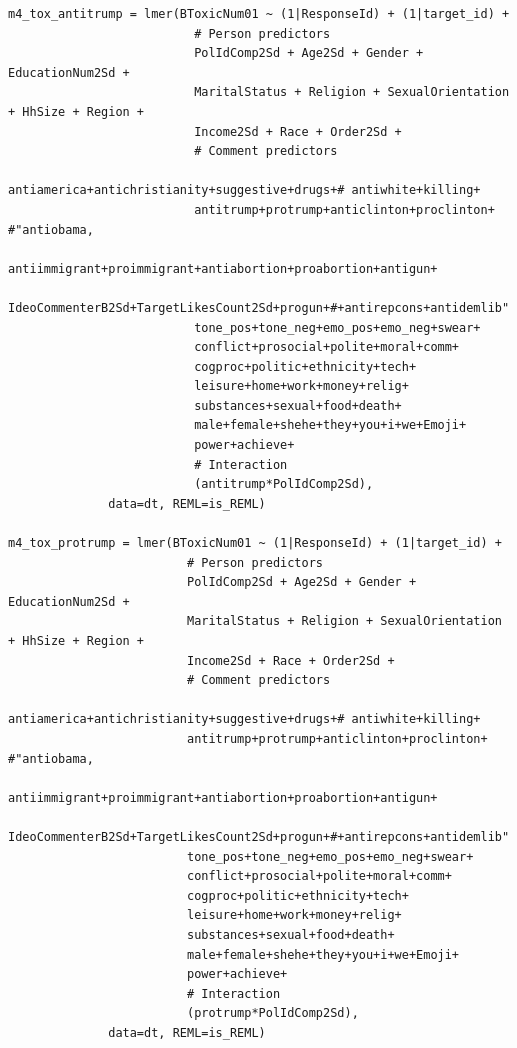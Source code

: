 \documentclass{article}
\begin{document}
\begin{lstlisting}
m4_tox_antitrump = lmer(BToxicNum01 ~ (1|ResponseId) + (1|target_id) + 
                          # Person predictors
                          PolIdComp2Sd + Age2Sd + Gender + EducationNum2Sd + 
                          MaritalStatus + Religion + SexualOrientation + HhSize + Region + 
                          Income2Sd + Race + Order2Sd + 
                          # Comment predictors  
                          antiamerica+antichristianity+suggestive+drugs+# antiwhite+killing+
                          antitrump+protrump+anticlinton+proclinton+ #"antiobama,
                          antiimmigrant+proimmigrant+antiabortion+proabortion+antigun+
                          IdeoCommenterB2Sd+TargetLikesCount2Sd+progun+#+antirepcons+antidemlib"
                          tone_pos+tone_neg+emo_pos+emo_neg+swear+
                          conflict+prosocial+polite+moral+comm+
                          cogproc+politic+ethnicity+tech+
                          leisure+home+work+money+relig+  
                          substances+sexual+food+death+    
                          male+female+shehe+they+you+i+we+Emoji+
                          power+achieve+
                          # Interaction
                          (antitrump*PolIdComp2Sd),
              data=dt, REML=is_REML)

m4_tox_protrump = lmer(BToxicNum01 ~ (1|ResponseId) + (1|target_id) + 
                         # Person predictors
                         PolIdComp2Sd + Age2Sd + Gender + EducationNum2Sd + 
                         MaritalStatus + Religion + SexualOrientation + HhSize + Region + 
                         Income2Sd + Race + Order2Sd + 
                         # Comment predictors  
                         antiamerica+antichristianity+suggestive+drugs+# antiwhite+killing+
                         antitrump+protrump+anticlinton+proclinton+ #"antiobama,
                         antiimmigrant+proimmigrant+antiabortion+proabortion+antigun+
                         IdeoCommenterB2Sd+TargetLikesCount2Sd+progun+#+antirepcons+antidemlib"
                         tone_pos+tone_neg+emo_pos+emo_neg+swear+
                         conflict+prosocial+polite+moral+comm+
                         cogproc+politic+ethnicity+tech+
                         leisure+home+work+money+relig+  
                         substances+sexual+food+death+    
                         male+female+shehe+they+you+i+we+Emoji+
                         power+achieve+
                         # Interaction
                         (protrump*PolIdComp2Sd),
              data=dt, REML=is_REML)


\end{lstlisting}
\end{document}
